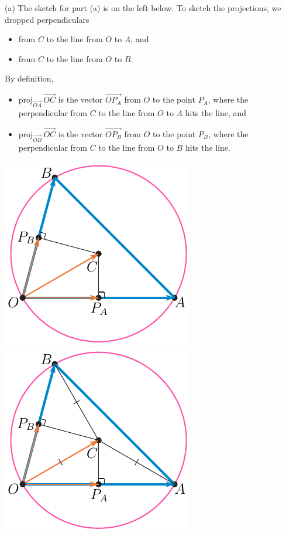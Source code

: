 \begin{solution}
(a) The sketch for part (a) is on the left below.
To sketch the projections, we dropped perpendiculars 
\begin{itemize}\itemsep1pt \parskip0pt  %
\item 
from $C$ to the line from $O$ to $A$, and 
\item 
from $C$ to the line from $O$ to $B$.
\end{itemize}
By definition, 
\begin{itemize}\itemsep1pt \parskip0pt  %
\item 
$\text{proj}_{\overrightarrow{\scriptstyle OA}}\,\overrightarrow{OC}$
is the vector $\overrightarrow{OP_A}$ from $O$ to the point $P_A$, where 
the perpendicular from $C$ to the line from $O$ to $A$ hits the line,
and 
\item 
$\text{proj}_{\overrightarrow{\scriptstyle OB}}\,\overrightarrow{OC}$
is the vector $\overrightarrow{OP_B}$ from $O$ to the point $P_B$, where 
the perpendicular from $C$ to the line from $O$ to $B$ hits the line.
\end{itemize}
\begin{center}
     \includegraphics{fig/circumA.pdf}\qquad\qquad
     \includegraphics{fig/circum.pdf}

\end{center}
\end{solution}
